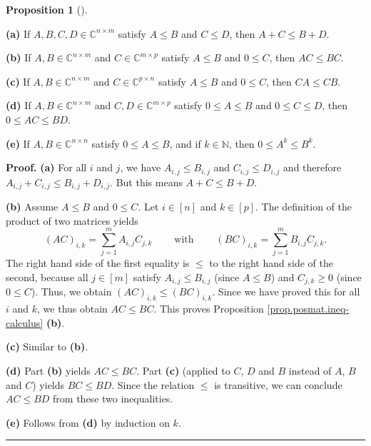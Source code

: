 \documentclass[numbers=enddot,12pt,final,onecolumn,notitlepage]{scrartcl}%
\numberwithin{exer}{subsection}
\theoremstyle{definition}
\newtheorem{prop}[theo]{Proposition}
\newenvironment{proposition}[1][]
{\begin{prop}[#1]\begin{leftbar}}
{\end{leftbar}\end{prop}}
\newenvironment{proof}[1][Proof]{\noindent\textbf{#1.} }{\ \rule{0.5em}{0.5em}}
\let\sumnonlimits\sum
\renewcommand{\sum}{\sumnonlimits\limits}
\begin{document}
\begin{proposition}
\label{prop.posmat.ineq-calculus}\textbf{(a)} If $A,B,C,D\in\mathbb{C}%
^{n\times m}$ satisfy $A\leq B$ and $C\leq D$, then $A+C\leq B+D$. \medskip

\textbf{(b)} If $A,B\in\mathbb{C}^{n\times m}$ and $C\in\mathbb{C}^{m\times
p}$ satisfy $A\leq B$ and $0\leq C$, then $AC\leq BC$. \medskip

\textbf{(c)} If $A,B\in\mathbb{C}^{n\times m}$ and $C\in\mathbb{C}^{p\times
n}$ satisfy $A\leq B$ and $0\leq C$, then $CA\leq CB$. \medskip

\textbf{(d)} If $A,B\in\mathbb{C}^{n\times m}$ and $C,D\in\mathbb{C}^{m\times
p}$ satisfy $0\leq A\leq B$ and $0\leq C\leq D$, then $0\leq AC\leq BD$. \medskip

\textbf{(e)} If $A,B\in\mathbb{C}^{n\times n}$ satisfy $0\leq A\leq B$, and if
$k\in\mathbb{N}$, then $0\leq A^{k}\leq B^{k}$.
\end{proposition}

\begin{proof}
\textbf{(a)} For all $i$ and $j$, we have $A_{i,j}\leq B_{i,j}$ and
$C_{i,j}\leq D_{i,j}$ and therefore $A_{i,j}+C_{i,j}\leq B_{i,j}+D_{i,j}$. But
this means $A+C\leq B+D$. \medskip

\textbf{(b)} Assume $A\leq B$ and $0\leq C$. Let $i\in\left[  n\right]  $ and
$k\in\left[  p\right]  $. The definition of the product of two matrices
yields
\[
\left(  AC\right)  _{i,k}=\sum_{j=1}^{m}A_{i,j}C_{j,k}%
\ \ \ \ \ \ \ \ \ \ \text{with}\ \ \ \ \ \ \ \ \ \ \left(  BC\right)
_{i,k}=\sum_{j=1}^{m}B_{i,j}C_{j,k}.
\]
The right hand side of the first equality is $\leq$ to the right hand side of
the second, because all $j\in\left[  m\right]  $ satisfy $A_{i,j}\leq B_{i,j}$
(since $A\leq B$) and $C_{j,k}\geq0$ (since $0\leq C$). Thus, we obtain
$\left(  AC\right)  _{i,k}\leq\left(  BC\right)  _{i,k}$. Since we have proved
this for all $i$ and $k$, we thus obtain $AC\leq BC$. This proves Proposition
\ref{prop.posmat.ineq-calculus} \textbf{(b)}. \medskip

\textbf{(c)} Similar to \textbf{(b)}. \medskip

\textbf{(d)} Part \textbf{(b)} yields $AC\leq BC$. Part \textbf{(c)} (applied
to $C$, $D$ and $B$ instead of $A$, $B$ and $C$) yields $BC\leq BD$. Since the
relation $\leq$ is transitive, we can conclude $AC\leq BD$ from these two
inequalities. \medskip

\textbf{(e)} Follows from \textbf{(d)} by induction on $k$.
\end{proof}
\end{document}
